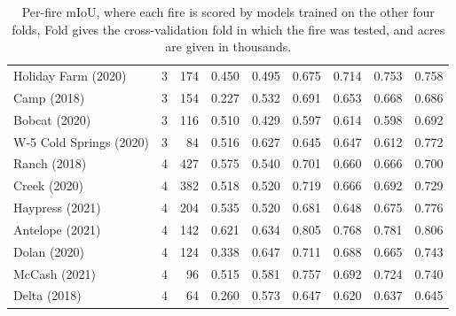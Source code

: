 \begin{table}[H]
\begin{tabular}{lcrcccccc}
Holiday Farm (2020) & 3 & 174 & 0.450 & 0.495 & 0.675 & 0.714 & 0.753 & 0.758 \\
Camp (2018) & 3 & 154 & 0.227 & 0.532 & 0.691 & 0.653 & 0.668 & 0.686 \\
Bobcat (2020) & 3 & 116 & 0.510 & 0.429 & 0.597 & 0.614 & 0.598 & 0.692 \\
W-5 Cold Springs (2020) & 3 & 84 & 0.516 & 0.627 & 0.645 & 0.647 & 0.612 & 0.772 \\
Ranch (2018) & 4 & 427 & 0.575 & 0.540 & 0.701 & 0.660 & 0.666 & 0.700 \\
Creek (2020) & 4 & 382 & 0.518 & 0.520 & 0.719 & 0.666 & 0.692 & 0.729 \\
Haypress (2021) & 4 & 204 & 0.535 & 0.520 & 0.681 & 0.648 & 0.675 & 0.776 \\
Antelope (2021) & 4 & 142 & 0.621 & 0.634 & 0.805 & 0.768 & 0.781 & 0.806 \\
Dolan (2020) & 4 & 124 & 0.338 & 0.647 & 0.711 & 0.688 & 0.665 & 0.743 \\
McCash (2021) & 4 & 96 & 0.515 & 0.581 & 0.757 & 0.692 & 0.724 & 0.740 \\
Delta (2018) & 4 & 64 & 0.260 & 0.573 & 0.647 & 0.620 & 0.637 & 0.645 \\
\bottomrule
\end{tabular}
\caption{Per-fire mIoU, where each fire is scored by models trained on the other four folds, Fold gives the cross-validation fold in which the fire was tested, and acres are given in thousands.}
\label{tab:perfire}
\end{table}
